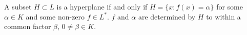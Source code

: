 A subset $H \subset L$ is a hyperplane if and only if $H = \{x : f(x) = \alpha\}$ for some $\alpha \in K$ and some non-zero $f \in L^*$. $f$ and $\alpha$ are determined by $H$ to within a common factor $\beta$, $0 \neq \beta \in K$.
